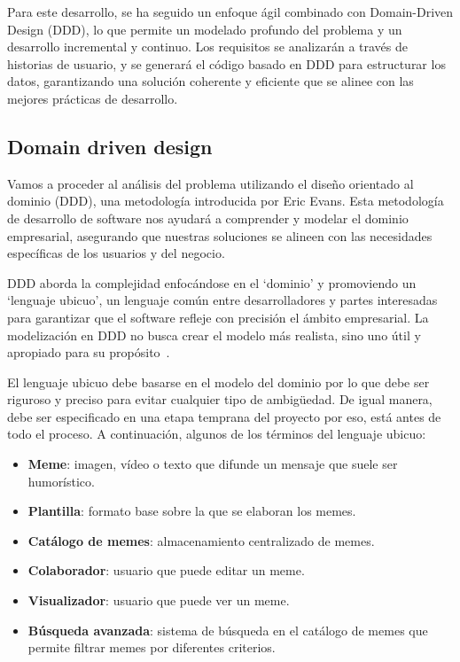 Para este desarrollo, se ha seguido un enfoque ágil combinado con Domain-Driven Design (DDD), lo que permite un modelado profundo del problema y un desarrollo incremental y continuo. Los requisitos se analizarán a través de historias de usuario, y se generará el código basado en DDD para estructurar los datos, garantizando una solución coherente y eficiente que se alinee con las mejores prácticas de desarrollo.

\subsection{Domain driven design}

Vamos a proceder al análisis del problema utilizando el diseño orientado al dominio (DDD), una metodología introducida por Eric Evans. Esta metodología de desarrollo de software nos ayudará a comprender y modelar el dominio empresarial, asegurando que nuestras soluciones se alineen con las necesidades específicas de los usuarios y del negocio.

DDD aborda la complejidad enfocándose en el `dominio' y promoviendo un `lenguaje ubicuo', un lenguaje común entre desarrolladores y partes interesadas para garantizar que el software refleje con precisión el ámbito empresarial. La modelización en DDD no busca crear el modelo más realista, sino uno útil y apropiado para su propósito~\cite{evans2004domain}.

El lenguaje ubicuo debe basarse en el modelo del dominio por lo que debe ser riguroso y preciso para evitar cualquier tipo de ambigüedad. De igual manera, debe ser especificado en una etapa temprana del proyecto por eso, está antes de todo el proceso. A continuación, algunos de los términos del lenguaje ubicuo:

\begin{itemize}
    \item \textbf{Meme}: imagen, vídeo o texto que difunde un mensaje que suele ser humorístico.
    \item \textbf{Plantilla}: formato base sobre la que se elaboran los memes.
    \item \textbf{Catálogo de memes}: almacenamiento centralizado de memes.
    \item \textbf{Colaborador}: usuario que puede editar un meme.
    \item \textbf{Visualizador}: usuario que puede ver un meme.
    \item \textbf{Búsqueda avanzada}: sistema de búsqueda en el catálogo de memes que permite filtrar memes por diferentes criterios.
\end{itemize}

